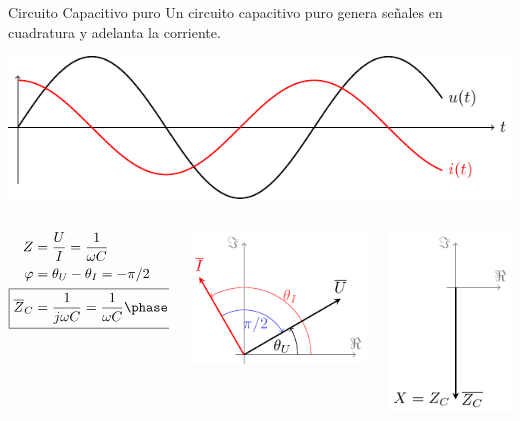 \documentclass[aspectratio=169, usenames,svgnames,dvipsnames]{beamer}
\begin{document}
\begin{frame}[label={sec:org9a359fb}]{Circuito Capacitivo puro}
Un circuito capacitivo puro genera \alert{señales en cuadratura} y \alert{adelanta la corriente}.

\begin{center}
\includegraphics[height=0.3\textheight]{../figs/capacitivoPuro.pdf}
\end{center}

\begin{columns}
\begin{column}{0.3\columnwidth}
\begin{align*}
  Z &= \dfrac{U}{I} = \dfrac{1}{\omega C}\\
  \varphi &= \theta_U - \theta_I = - \pi/2\\
  \Aboxed{\overline{Z}_C &= \dfrac{1}{j\omega C} = \dfrac{1}{\omega C}\phase{\ang{-90}}}
\end{align*}
\end{column}


\begin{column}{0.4\columnwidth}
\begin{center}
\includegraphics[height=0.4\textheight]{../figs/fasorCondensador_VI.pdf}
\end{center}
\end{column}


\begin{column}{0.3\columnwidth}
\begin{center}
\includegraphics[height=0.4\textheight]{../figs/fasorCondensador.pdf}
\end{center}
\end{column}
\end{columns}
\end{frame}
\end{document}
